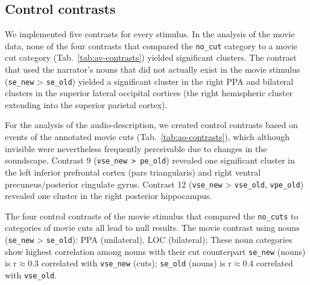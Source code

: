 \documentclass[english]{article}
\begin{document}
{


\subsection{Control contrasts}




We implemented five contrasts for every stimulus.
In the analysis of the movie data, none of the four contrasts that compared the
\texttt{no\_cut} category to a movie cut category (Tab.~\ref{tab:av-contrasts})
yielded significant clusters.
The contrast that used the narrator's nouns that did not actually exist in the movie stimulus
(\texttt{se\_new} > \texttt{se\_old}) yielded a significant cluster in the right
PPA and bilateral clusters in the superior lateral occipital cortices (the right
hemispheric cluster extending into the superior parietal cortex).

For the analysis of the audio-description, we created control contrasts based on events of
the annotated movie cuts (Tab.~\ref{tab:ao-contrasts}), which although invisible
were nevertheless frequently perceivable due to changes in the soundscape.
Contrast 9 (\texttt{vse\_new > pe\_old}) revealed one significant cluster in the left
inferior prefrontal cortex (pars triangularis) and right ventral
precuneus/posterior cingulate gyrus.
Contrast 12 (\texttt{vse\_new} > \texttt{vse\_old}, \texttt{vpe\_old}) revealed
one cluster in the right posterior hippocampus.

The four control contrasts of the movie stimulus that compared the
\texttt{no\_cuts} to categories of movie cuts all lead to null results.
The movie contrast using nouns (\texttt{se\_new} > \texttt{se\_old}): PPA
(unilateral), LOC (bilateral); These noun categories show highest correlation
among nouns with their cut counterpart \texttt{se\_new} (nouns) is r$\approx$0.3
correlated with \texttt{vse\_new} (cuts); \texttt{se\_old} (nouns) is
r$\approx$0.4 correlated with \texttt{vse\_old}.

}
\end{document}

